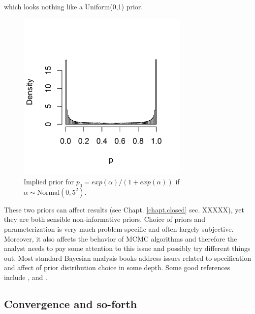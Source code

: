 which looks nothing like a Uniform(0,1) prior.
\begin{figure}[htp]
\begin{center}
\includegraphics[height=3.3in]{Ch2/figs/implied_prior}
\end{center}
\caption{Implied prior for $p_{0} = exp(\alpha)/(1+exp(\alpha))$ 
if $\alpha \sim \mbox{Normal}(0, 5^2)$.}
\label{glms.fig.impliedprior}
\end{figure}
These two priors can
affect results (see Chapt. \ref{chapt.closed} sec. XXXXX), yet they are both 
sensible
non-informative priors. Choice of priors and parameterization is
very much problem-specific and often largely subjective. Moreover, it
also affects the behavior of MCMC algorithms and therefore the analyst
needs to pay some attention to this issue and possibly try different
things out.
Most standard Bayesian analysis books address issues related to specification and
affect of prior distribution choice in some depth. Some good references include 
\citet{kass_wasserman:1996}, \citet{gelman:2006} and \citet{link_barker:2009}.


\subsection{Convergence and so-forth}
\label{glms.sec.convergence}


